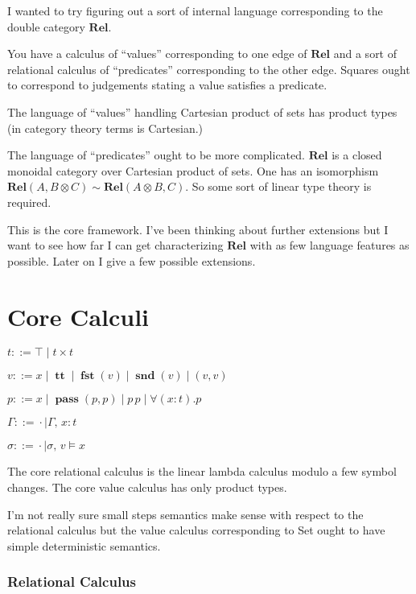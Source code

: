\documentclass[twocolumn]{scrartcl}
\newcommand{\Rel}{\textbf{Rel}}
\newcommand{\bnfdef}{\mathbin{::=}}
\DeclareMathOperator{\coin}{\textbf{tt}}
\DeclareMathOperator{\fst}{\textbf{fst}}
\DeclareMathOperator{\snd}{\textbf{snd}}
\DeclareMathOperator{\pass}{\textbf{pass}}
\begin{document}
I wanted to try figuring out a sort of internal language corresponding
to the double category \(\Rel\).

You have a calculus of ``values'' corresponding to one edge of
\(\Rel\) and a sort of relational calculus of ``predicates''
corresponding to the other edge. Squares ought to correspond to
judgements stating a value satisfies a predicate.

The language of ``values'' handling Cartesian product of sets has
product types (in category theory terms is Cartesian.)

The language of ``predicates'' ought to be more complicated. \(\Rel\)
is a closed monoidal category over Cartesian product of sets.  One has
an isomorphism \( \Rel(A, B \otimes C) \sim \Rel (A \otimes B, C) \).
So some sort of linear type theory is required.

This is the core framework.  I've been thinking about further
extensions but I want to see how far I can get characterizing
\(\Rel\) with as few language features as possible.  Later on I
give a few possible extensions.

\section*{Core Calculi}

\begin{description}[nosep]
\item[Types] \hfill \( t \bnfdef \top \mid t \times t \)
\item[Values] \hfill \( v \bnfdef x \mid \coin \mid \fst(v) \mid \snd(v) \mid ( v , v ) \)
\item[Predicates] \hfill \( p \bnfdef x \mid \pass(p, p) \mid p \, p \mid \forall (x \colon t) . p \)
\item[Environment] \hfill \( \Gamma \bnfdef \cdot \mid \Gamma , \, x \colon t  \)
\item[Substitutions] \hfill \( \sigma \bnfdef \cdot \mid \sigma , \, v \models x  \)
\end{description}

The core relational calculus is the linear lambda calculus modulo a
few symbol changes.  The core value calculus has only product types.

I'm not really sure small steps semantics make sense with respect to
the relational calculus but the value calculus corresponding to Set
ought to have simple deterministic semantics.

\subsubsection*{Relational Calculus}
\end{document}
